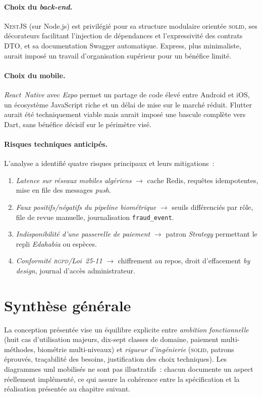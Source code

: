 \documentclass[12pt, a4paper, oneside]{report}
\begin{document}
\paragraph{Choix du \textit{back-end}.} \textsc{NestJS} (sur Node.js) est privilégié pour sa structure modulaire orientée \textsc{solid}, ses décorateurs facilitant l'injection de dépendances et l'expressivité des contrats DTO, et sa documentation Swagger automatique. Express, plus minimaliste, aurait imposé un travail d'organisation supérieur pour un bénéfice limité.

\paragraph{Choix du mobile.} \textit{React~Native} avec \textit{Expo} permet un partage de code élevé entre Android et iOS, un écosystème JavaScript riche et un délai de mise sur le marché réduit. Flutter aurait été techniquement viable mais aurait imposé une bascule complète vers Dart, sans bénéfice décisif sur le périmètre visé.

\paragraph{Risques techniques anticipés.} L'analyse a identifié quatre risques principaux et leurs mitigations~:
\begin{enumerate}
  \item \textit{Latence sur réseaux mobiles algériens} $\to$ cache Redis, requêtes idempotentes, mise en file des messages \textit{push}.
  \item \textit{Faux positifs/négatifs du pipeline biométrique} $\to$ seuils différenciés par rôle, file de revue manuelle, journalisation \texttt{fraud\_event}.
  \item \textit{Indisponibilité d'une passerelle de paiement} $\to$ patron \textit{Strategy} permettant le repli \textit{Edahabia} ou espèces.
  \item \textit{Conformité \textsc{rgpd}/Loi~25-11} $\to$ chiffrement au repos, droit d'effacement \textit{by design}, journal d'accès administrateur.
\end{enumerate}

\section{Synthèse générale}
\label{sec:synthese-conception}

La conception présentée vise un équilibre explicite entre \textit{ambition fonctionnelle} (huit cas d'utilisation majeurs, dix-sept classes de domaine, paiement multi-méthodes, biométrie multi-niveaux) et \textit{rigueur d'ingénierie} (\textsc{solid}, patrons éprouvés, traçabilité des besoins, justification des choix techniques). Les diagrammes \gls{uml} mobilisés ne sont pas illustratifs~: chacun documente un aspect réellement implémenté, ce qui assure la cohérence entre la spécification et la réalisation présentée au chapitre suivant.
\end{document}
